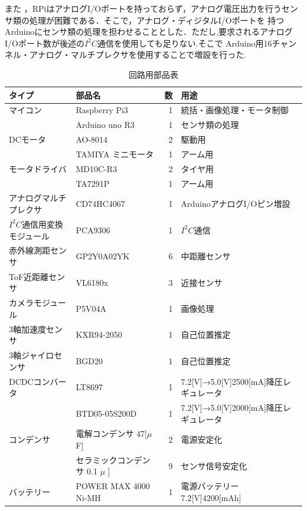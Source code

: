 また ，RPiはアナログI/Oポートを持っておらず，アナログ電圧出力を行うセンサ類の処理が困難である．そこで，アナログ・ディジタルI/Oポートを
持つArduinoにセンサ類の処理を担わせることとした．ただし,要求されるアナログI/Oポート数が後述の$I^2 C$通信を使用しても足りない.そこで
Arduino用16チャンネル・アナログ・マルチプレクサを使用することで増設を行った.
\begin{table}[h]
  \centering
  \caption{回路用部品表}
  \begin{tabular}{|l|l|r||l|} \hline
    タイプ & 部品名 & 数 & 用途 \\ \hline \hline
     マイコン & Raspberry Pi3 & 1& 統括・画像処理・モータ制御 \\ \cline{2-4}
   　　& Arduino uno R3& 1 & センサ類の処理 \\ \hline
     DCモータ & AO-8014 & 2 & 駆動用 \\ \cline{2-4}
      & TAMIYA ミニモータ & 1&アーム用  \\ \hline
    モータドライバ& MD10C-R3 & 2& タイヤ用 \\ \cline{2-4}
      &  TA7291P&1 &アーム用 \\ \hline
   アナログマルチプレクサ & CD74HC4067 & 1 & ArduinoアナログI/Oピン増設 \\ \hline
    $I^2 C$通信用変換モジュール&PCA9306&1&$I^2 C$通信\\ \hline
     赤外線測距センサ& GP2Y0A02YK &6&中距離センサ\\ \hline
      ToF近距離センサ& VL6180x&3&近接センサ \\ \hline
     カメラモジュール&P5V04A&1&画像処理\\ \hline
     3軸加速度センサ&KXR94-2050&1&自己位置推定\\ \hline
     3軸ジャイロセンサ&BGD20&1&自己位置推定\\ \hline
    DCDCコンバータ&LT8697&1& 7.2[V]→5.0[V]2500[mA]降圧レギュレータ\\ \cline{2-4}
       &BTD05-05S200D&1&7.2[V]→5.0[V]2000[mA]降圧レギュレータ\\ \hline
    コンデンサ&電解コンデンサ 47[$\mu$F]&2&電源安定化\\ \cline{2-4}
            &セラミックコンデンサ 0.1 $\mu$ ]&9&センサ信号安定化\\ \hline
   バッテリー&POWER MAX 4000 Ni-MH&1&電源バッテリー 7.2[V]4200[mAh]\\ \hline
                 
  \end{tabular}
  \label{tab:c_parts}
\end{table}
